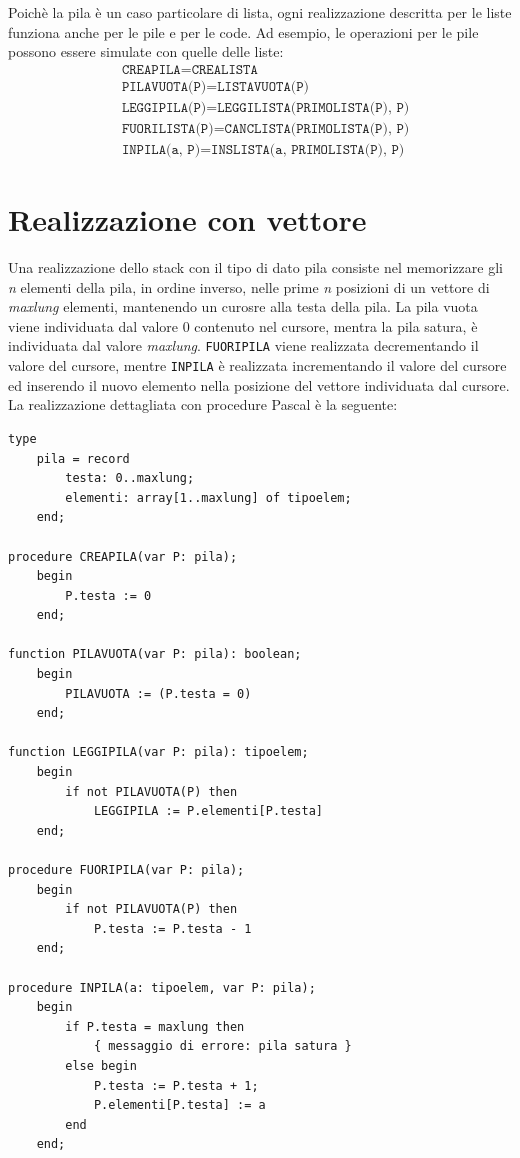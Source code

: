\documentclass[12pt]{report}
\begin{document}
	Poichè la pila è un caso particolare di lista, ogni realizzazione descritta per le liste funziona anche per le pile e per le code. Ad esempio, le operazioni per le pile possono essere simulate con quelle delle liste:
	\begin{align*}
		&\texttt{CREAPILA} = \texttt{CREALISTA} \\
		&\texttt{PILAVUOTA(P)} = \texttt{LISTAVUOTA(P)} \\
		&\texttt{LEGGIPILA(P)} = \texttt{LEGGILISTA(PRIMOLISTA(P), P)} \\
		&\texttt{FUORILISTA(P)} = \texttt{CANCLISTA(PRIMOLISTA(P), P)} \\
		&\texttt{INPILA(a, P)} = \texttt{INSLISTA(a, PRIMOLISTA(P), P)}
	\end{align*}
	\section{Realizzazione con vettore}
	Una realizzazione dello stack con il tipo di dato pila consiste nel memorizzare gli \textit{n} elementi della pila, in ordine inverso, nelle prime \textit{n} posizioni di un vettore di \textit{maxlung} elementi, mantenendo un curosre alla testa della pila. La pila vuota viene individuata dal valore 0 contenuto nel cursore, mentra la pila satura, è individuata dal valore \textit{maxlung}. \texttt{FUORIPILA} viene realizzata decrementando il valore del cursore, mentre \texttt{INPILA} è realizzata incrementando il valore del cursore ed inserendo il nuovo elemento nella posizione del vettore individuata dal cursore. La realizzazione dettagliata con procedure Pascal è la seguente:
	\begin{lstlisting}[style=pascalstyle]
type
	pila = record
		testa: 0..maxlung;
		elementi: array[1..maxlung] of tipoelem;
	end;

procedure CREAPILA(var P: pila);
	begin
		P.testa := 0
	end;

function PILAVUOTA(var P: pila): boolean;
	begin
		PILAVUOTA := (P.testa = 0)
	end;

function LEGGIPILA(var P: pila): tipoelem;
	begin
		if not PILAVUOTA(P) then
			LEGGIPILA := P.elementi[P.testa]
	end;

procedure FUORIPILA(var P: pila);
	begin
		if not PILAVUOTA(P) then
			P.testa := P.testa - 1
	end;

procedure INPILA(a: tipoelem, var P: pila);
	begin
		if P.testa = maxlung then
			{ messaggio di errore: pila satura }
		else begin
			P.testa := P.testa + 1;
			P.elementi[P.testa] := a
		end
	end;
	\end{lstlisting}
\end{document}
